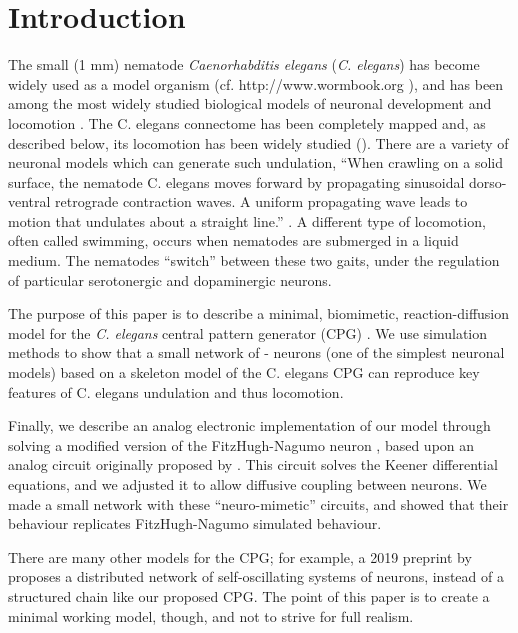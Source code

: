 \documentclass[
    11pt,
]{article}
\begin{document}
\section{Introduction}\label{sec: intro}

The small (1 mm) nematode \emph{Caenorhabditis elegans} (\emph{C. elegans}) has become widely used as a model organism (cf. http://www.wormbook.org \cite{corsi2015}), and has been among the most widely studied biological models of neuronal development and locomotion \citep{katz2016, corsi2015}.
The C. elegans connectome has been completely mapped \citep{jabr} and, as described below, its locomotion has been widely studied (\citet{corsi2015}).  There are a variety of neuronal models which can generate such undulation,
``When crawling on a solid surface, the nematode C. elegans moves forward by propagating sinusoidal dorso-ventral retrograde contraction waves.  A uniform propagating wave leads to motion that undulates about a straight line.'' \citep{kim2011}.
A different type of locomotion, often called swimming, occurs when nematodes are submerged in a liquid medium. The nematodes “switch” between these two gaits, under the regulation of particular serotonergic and dopaminergic neurons.

The purpose of this paper is to describe a minimal, biomimetic, reaction-diffusion model for the \emph{C. elegans} central pattern generator (CPG) \citep{xu2018, wen2012}.  We use simulation methods to show that a small network of \citet{fitzhugh1955}-\citet{nagumo1962} neurons (one of the simplest neuronal models) based on a skeleton model of the C. elegans CPG can reproduce key features of C. elegans undulation \citep{magnes2012} and thus locomotion.

Finally, we describe an analog electronic implementation of our model through solving a modified version of the FitzHugh-Nagumo neuron \cite{fitzhugh1955}, based upon an analog circuit originally proposed by \citet{keener1983}.  This circuit solves the Keener differential equations, and we adjusted it to allow diffusive coupling between neurons.  We made a small network with these ``neuro-mimetic'' circuits, and showed that their behaviour replicates FitzHugh-Nagumo simulated behaviour.

There are many other models for the CPG; for example, a 2019 preprint by \cite{olivares2019} proposes a distributed network of self-oscillating systems of neurons, instead of a structured chain like our proposed CPG.  The point of this paper is to create a minimal working model, though, and not to strive for full realism.
\end{document}
